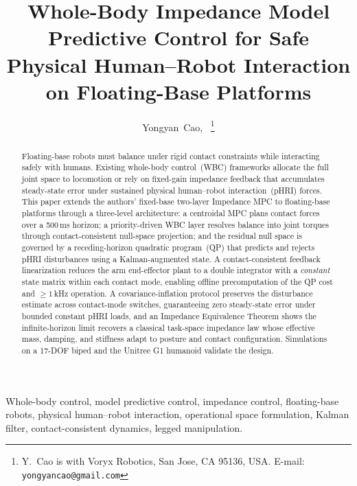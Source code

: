 \documentclass[journal]{IEEEtran}
\begin{document}
\title{Whole-Body Impedance Model Predictive Control for Safe
       Physical Human--Robot Interaction on Floating-Base Platforms}

\author{Yongyan~Cao,~\IEEEmembership{}%
  \thanks{Y.~Cao is with Voryx Robotics, San Jose, CA 95136, USA.
          E-mail: \texttt{yongyancao@gmail.com}}}

\maketitle

\begin{abstract}
Floating-base robots must balance under rigid contact constraints while
interacting safely with humans.
Existing whole-body control~(WBC) frameworks allocate the full joint space
to locomotion or rely on fixed-gain impedance feedback that accumulates
steady-state error under sustained physical human--robot
interaction~(pHRI) forces.
This paper extends the authors' fixed-base two-layer Impedance MPC to
floating-base platforms through a three-level architecture: a centroidal
MPC plans contact forces over a 500\,ms horizon; a priority-driven WBC
layer resolves balance into joint torques through contact-consistent
null-space projection; and the residual null space is governed by a
receding-horizon quadratic program~(QP) that predicts and rejects pHRI
disturbances using a Kalman-augmented state.
A contact-consistent feedback linearization reduces the arm end-effector
plant to a double integrator with a \emph{constant} state matrix within
each contact mode, enabling offline precomputation of the QP cost and
${\geq}1$\,kHz operation.
A covariance-inflation protocol preserves the disturbance estimate across
contact-mode switches, guaranteeing zero steady-state error under bounded
constant pHRI loads, and an Impedance Equivalence Theorem shows the
infinite-horizon limit recovers a classical task-space impedance law whose
effective mass, damping, and stiffness adapt to posture and contact
configuration.
Simulations on a 17-DOF biped and the Unitree G1 humanoid validate the
design.
\end{abstract}

\begin{IEEEkeywords}
Whole-body control, model predictive control, impedance control,
floating-base robots, physical human--robot interaction, operational space
formulation, Kalman filter, contact-consistent dynamics, legged
manipulation.
\end{IEEEkeywords}
\end{document}
